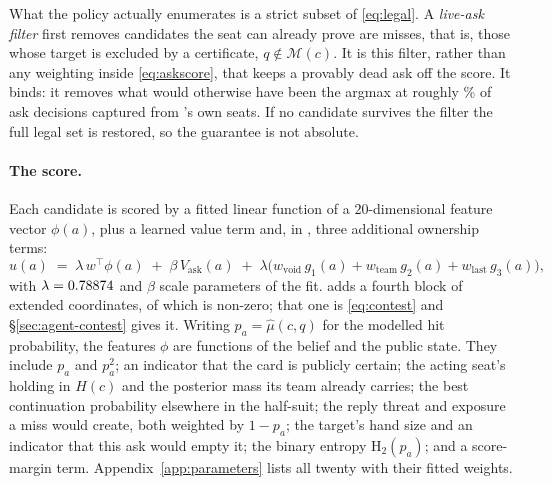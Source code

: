 What the policy actually enumerates is a strict subset of \eqref{eq:legal}. A \emph{live-ask filter} first removes candidates the seat can already prove are misses, that is,
those whose target is excluded by a certificate, $q \notin \mathcal{M}(c)$. It is this filter, rather
than any weighting inside \eqref{eq:askscore}, that keeps a provably dead ask off the score. It
binds: it removes what would otherwise have been the argmax at roughly \vsevenGateBindRate\% of
\vsevenGateBindN{} ask decisions captured from \sestina{}'s own seats. If no candidate survives the filter the full legal set is
restored, so the guarantee is not absolute.

\paragraph{The score.} Each candidate is scored by a fitted linear function of a
$20$-dimensional feature vector $\phi(a)$, plus a learned value term and, in \sestina{}, three
additional ownership terms:
\begin{equation}
  u(a) \;=\; \lambda\, w^{\!\top}\phi(a) \;+\; \beta\, V_{\mathrm{ask}}(a)
  \;+\; \lambda\bigl(w_{\mathrm{void}}\, g_1(a) + w_{\mathrm{team}}\, g_2(a)
  + w_{\mathrm{last}}\, g_3(a)\bigr),
  \label{eq:askscore}
\end{equation}
with $\lambda = 0.78874{}$ and $\beta$ scale parameters of the fit. \sestina{} adds a
fourth block of \vsevenResponderTotal{} extended coordinates, of which
\vsevenResponderNonzero{} is non-zero; that one is \eqref{eq:contest} and
\S\ref{sec:agent-contest} gives it. Writing $p_a = \hat\mu(c,q)$ for the modelled
hit probability, the features $\phi$ are functions of the belief and the public state. They include $p_a$ and $p_a^2$; an indicator that the card is publicly
certain; the acting seat's holding in $H(c)$ and the posterior mass its team already carries; the
best continuation probability elsewhere in the half-suit; the
reply threat and exposure a miss would create, both weighted by $1-p_a$; the target's hand size and
an indicator that this ask would empty it; the binary entropy $\mathrm{H}_2(p_a)$; and a score-margin
term. Appendix~\ref{app:parameters} lists all twenty with their fitted weights.

